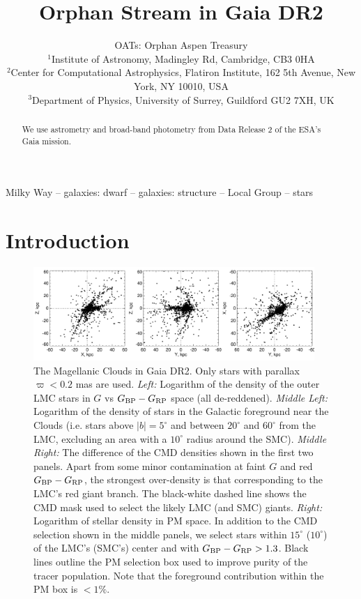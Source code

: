 \documentclass[a4paper,useAMS,usenatbib]{mnras}
\title[Orphan Stream in Gaia DR2]{Orphan Stream in Gaia DR2}
\author[OATs]{OATs: Orphan Aspen Treasury\\
  $^{1}$Institute of Astronomy, Madingley Rd, Cambridge, CB3 0HA\\
  $^{2}$Center for Computational Astrophysics, Flatiron Institute, 162 5th Avenue, New York, NY 10010, USA\\
  $^{3}$Department of Physics, University of Surrey, Guildford GU2 7XH, UK\\
}
\begin{document}
\maketitle

\label{firstpage}

\begin{abstract}
We use astrometry and broad-band photometry from Data Release 2 of the
ESA's Gaia mission.

\end{abstract}

\begin{keywords}
Milky Way -- galaxies: dwarf -- galaxies: structure -- Local Group -- stars
\end{keywords}

\section{Introduction}



%
\begin{figure}
  \centering
  \includegraphics[width=0.95\textwidth]{orphan_paper_xyz.pdf}
  \caption[]{The Magellanic Clouds in Gaia DR2. Only stars with
    parallax $\varpi<0.2$ mas are used. {\it Left:} Logarithm of the
    density of the outer LMC stars in $G$ vs $G_{\rm BP}-G_{\rm RP}$
    space (all de-reddened). {\it Middle Left:} Logarithm of the
    density of stars in the Galactic foreground near the Clouds
    (i.e. stars above $|b|=5^{\circ}$ and between $20^{\circ}$ and
    $60^{\circ}$ from the LMC, excluding an area with a $10^{\circ}$
    radius around the SMC). {\it Middle Right:} The difference of the
    CMD densities shown in the first two panels. Apart from some minor
    contamination at faint $G$ and red $G_{\rm BP}-G_{\rm RP}$, the
    strongest over-density is that corresponding to the LMC's red
    giant branch. The black-white dashed line shows the CMD mask used
    to select the likely LMC (and SMC) giants. {\it Right:} Logarithm
    of stellar density in PM space. In addition to the CMD selection
    shown in the middle panels, we select stars within $15^{\circ}$
    ($10^{\circ}$) of the LMC's (SMC's) center and with $G_{\rm
      BP}-G_{\rm RP} > 1.3$. Black lines outline the PM selection box
    used to improve purity of the tracer population. Note that the
    foreground contribution within the PM box is $<1\%$.}
   \label{fig:selection}
\end{figure}
%
\end{document}
